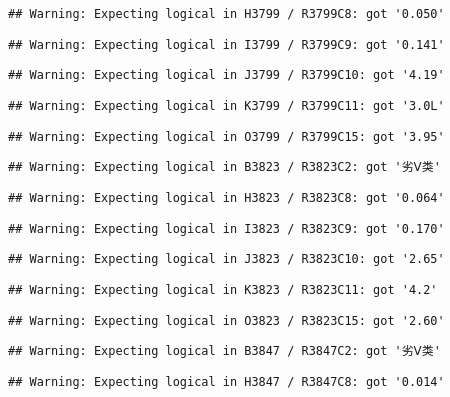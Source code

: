 \documentclass[
]{article}
\begin{document}
\begin{verbatim}
## Warning: Expecting logical in H3799 / R3799C8: got '0.050'
\end{verbatim}

\begin{verbatim}
## Warning: Expecting logical in I3799 / R3799C9: got '0.141'
\end{verbatim}

\begin{verbatim}
## Warning: Expecting logical in J3799 / R3799C10: got '4.19'
\end{verbatim}

\begin{verbatim}
## Warning: Expecting logical in K3799 / R3799C11: got '3.0L'
\end{verbatim}

\begin{verbatim}
## Warning: Expecting logical in O3799 / R3799C15: got '3.95'
\end{verbatim}

\begin{verbatim}
## Warning: Expecting logical in B3823 / R3823C2: got '劣Ⅴ类'
\end{verbatim}

\begin{verbatim}
## Warning: Expecting logical in H3823 / R3823C8: got '0.064'
\end{verbatim}

\begin{verbatim}
## Warning: Expecting logical in I3823 / R3823C9: got '0.170'
\end{verbatim}

\begin{verbatim}
## Warning: Expecting logical in J3823 / R3823C10: got '2.65'
\end{verbatim}

\begin{verbatim}
## Warning: Expecting logical in K3823 / R3823C11: got '4.2'
\end{verbatim}

\begin{verbatim}
## Warning: Expecting logical in O3823 / R3823C15: got '2.60'
\end{verbatim}

\begin{verbatim}
## Warning: Expecting logical in B3847 / R3847C2: got '劣Ⅴ类'
\end{verbatim}

\begin{verbatim}
## Warning: Expecting logical in H3847 / R3847C8: got '0.014'
\end{verbatim}
\end{document}
